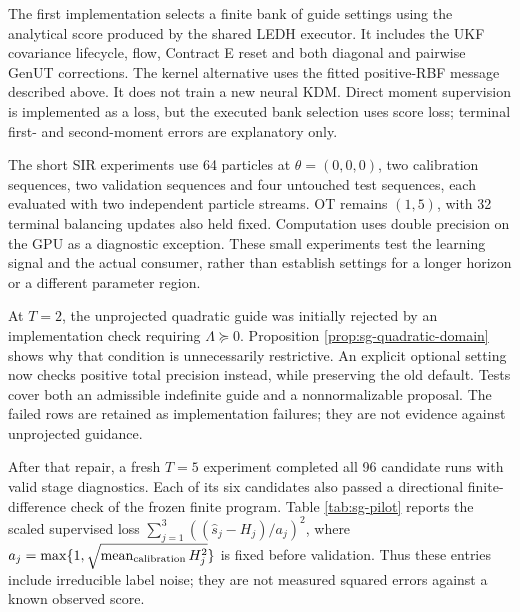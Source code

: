 The first implementation selects a finite bank of guide settings using the
analytical score produced by the shared LEDH executor. It includes the UKF
covariance lifecycle, flow, Contract E reset and both diagonal and pairwise
GenUT corrections. The kernel alternative uses the fitted positive-RBF
message described above. It does not train a new neural KDM. Direct moment
supervision is implemented as a loss, but the executed bank selection uses
score loss; terminal first- and second-moment errors are explanatory only.

The short SIR experiments use 64 particles at $\theta=(0,0,0)$, two
calibration sequences, two validation sequences and four untouched test
sequences, each evaluated with two independent particle streams. OT remains
$(1,5)$, with 32 terminal balancing updates also held fixed. Computation uses
double precision on the GPU as a diagnostic
exception. These small experiments test the learning signal and the actual
consumer, rather than establish settings for a longer horizon or a different
parameter region.

At $T=2$, the unprojected quadratic guide was initially rejected by an
implementation check requiring $\Lambda\succeq0$. Proposition
\ref{prop:sg-quadratic-domain} shows why that condition is unnecessarily
restrictive. An explicit optional setting now checks positive total precision
instead, while preserving the old default. Tests cover both an admissible
indefinite guide and a nonnormalizable proposal. The failed rows are retained
as implementation failures; they are not evidence against unprojected guidance.

After that repair, a fresh $T=5$ experiment completed all 96 candidate runs
with valid stage diagnostics. Each of its six candidates also passed a
directional finite-difference check of the frozen finite program. Table
\ref{tab:sg-pilot} reports the scaled supervised loss
$\sum_{j=1}^3((\widehat s_j-H_j)/a_j)^2$, where
$a_j=\max\{1,\sqrt{\operatorname{mean}_{\rm calibration}H_j^2}\}$
is fixed before validation. Thus these entries include irreducible label
noise; they are not measured squared errors against a known observed score.

